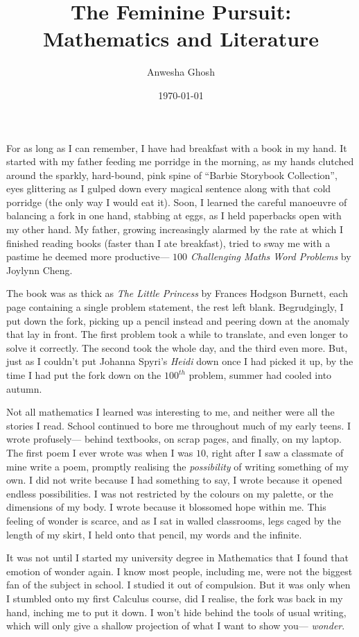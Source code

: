 \documentclass[11pt, letterpaper]{article}
\title{\vspace{-1.5em}\color{accent}\textbf{The Feminine Pursuit: Mathematics and Literature}}
\author{Anwesha Ghosh}
\date{\today}
\begin{document}
\maketitle
\thispagestyle{empty}

For as long as I can remember, I have had breakfast with a book in my hand. It started with my father feeding me porridge in the morning, as my hands clutched around the sparkly, hard-bound, pink spine of ``Barbie Storybook Collection'', eyes glittering as I gulped down every magical sentence along with that cold porridge (the only way I would eat it). Soon, I learned the careful manoeuvre of balancing a fork in one hand, stabbing at eggs, as I held paperbacks open with my other hand. My father, growing increasingly alarmed by the rate at which I finished reading books (faster than I ate breakfast), tried to sway me with a pastime he deemed more productive— \textit{$100$ Challenging Maths Word Problems} by Joylynn Cheng. 

The book was as thick as \textit{The Little Princess} by Frances Hodgson Burnett, each page containing a single problem statement, the rest left blank. Begrudgingly, I put down the fork, picking up a pencil instead and peering down at the anomaly that lay in front. The first problem took a while to translate, and even longer to solve it correctly. The second took the whole day, and the third even more. But, just as I couldn't put Johanna Spyri's \textit{Heidi} down once I had picked it up, by the time I had put the fork down on the $100^{th}$ problem, summer had cooled into autumn.

Not all mathematics I learned was interesting to me, and neither were all the stories I read. School continued to bore me throughout much of my early teens. I wrote profusely--- behind textbooks, on scrap pages, and finally, on my laptop. The first poem I ever wrote was when I was $10$, right after I saw a classmate of mine write a poem, promptly realising the \textit{possibility} of writing something of my own. I did not write because I had something to say, I wrote because it opened endless possibilities. I was not restricted by the colours on my palette, or the dimensions of my body. I wrote because it blossomed hope within me. This feeling of wonder is scarce, and as I sat in walled classrooms, legs caged by the length of my skirt, I held onto that pencil, my words and the infinite.

It was not until I started my university degree in Mathematics that I found that emotion of wonder again. I know most people, including me, were not the biggest fan of the subject in school. I studied it out of compulsion. But it was only when I stumbled onto my first Calculus course, did I realise, the fork was back in my hand, inching me to put it down. I won't hide behind the tools of usual writing, which will only give a shallow projection of what I want to show you— \textit{wonder}. 
\end{document}
